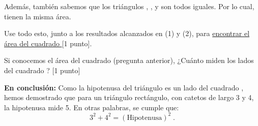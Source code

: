 \documentclass{DivinaPastora}
\begin{document}
Además, también sabemos que los triángulos , ,  y  son todos
iguales. Por lo cual, tienen la misma área.

Use todo esto, junto a los resultados alcanzados en (1) y (2), para 
\underline{encontrar el área del cuadrado } [1 punto].
\desarrollo[3cm]
\respuesta

\pregunta Si conocemos el área del cuadrado  (pregunta anterior), 
¿Cuánto miden los lados del cuadrado ? [1 punto]
\desarrollo[2cm]
\respuesta

{\bfseries En conclusión:} Como la hipotenusa del triángulo  es un lado del 
cuadrado , hemos demostrado que para un triángulo rectángulo, con 
catetos de largo 3 y 4, la hipotenusa mide 5. En otras palabras, se cumple que:
\begin{equation*}
    3^2 + 4^2 = (\textrm{Hipotenusa})^2 \;.
\end{equation*} 
\end{document}
